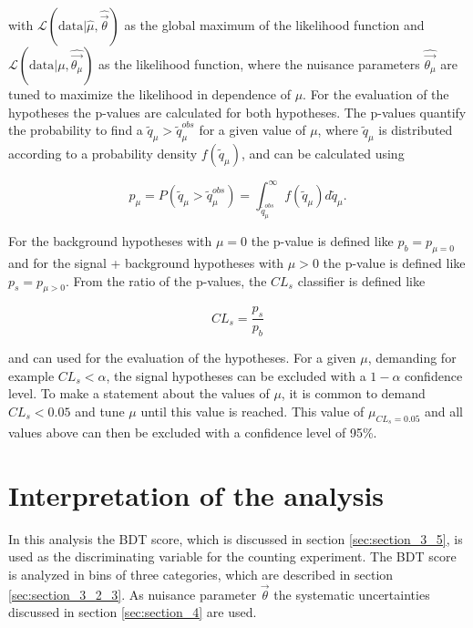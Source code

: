 with $\mathcal{L}(\text{data} | \hat{\mu}, \hat{\vec{\theta}})$ as the global maximum of the likelihood function and $\mathcal{L}(\text{data} | \mu, \hat{\vec{\theta_{\mu}}})$ as the likelihood function, where the nuisance parameters $\hat{\vec{\theta_{\mu}}}$ are tuned to maximize the likelihood in dependence of $\mu$. For the evaluation of the hypotheses the p-values are calculated for both hypotheses. The p-values quantify the probability to find a $\tilde{q}_{\mu} > \tilde{q}_{\mu}^{obs}$ for a given value of $\mu$, where $\tilde{q}_{\mu}$ is distributed according to a probability density $f(\tilde{q}_{\mu})$, and can be calculated using

\begin{equation}
	\label{eq:eq_5_3}
	p_{\mu} = P(\tilde{q}_{\mu} > \tilde{q}_{\mu}^{obs}) = \int_{\tilde{q}_{\mu}^{obs}}^{\infty} f(\tilde{q}_{\mu}) d\tilde{q}_{\mu}.
\end{equation}

For the background hypotheses with $\mu = 0$ the p-value is defined like $p_b = p_{\mu = 0}$ and for the signal + background hypotheses with $\mu>0$ the p-value is defined like $p_s = p_{\mu>0}$. From the ratio of the p-values, the $CL_s$ classifier is defined like

\begin{equation}
	\label{eq:eq_5_4}
	CL_s = \frac{p_s}{p_b}
\end{equation}

and can used for the evaluation of the hypotheses. For a given $\mu$, demanding for example $CL_{s} < \alpha$, the signal hypotheses can be excluded with a $1-\alpha$ confidence level. To make a statement about the values of $\mu$, it is common to demand $CL_{s} < 0.05$ and tune $\mu$ until this value is reached. This value of $\mu_{CL_s = 0.05}$ and all values above can then be excluded with a confidence level of 95\%.

\section{Interpretation of the analysis}
\label{sec:section_5_2}

In this analysis the \gls{BDT} score, which is discussed in section \ref{sec:section_3_5}, is used as the discriminating variable for the counting experiment. The \gls{BDT} score is analyzed in bins of three categories, which are described in section \ref{sec:section_3_2_3}. As nuisance parameter $\vec{\theta}$ the systematic uncertainties discussed in section \ref{sec:section_4} are used.\\

